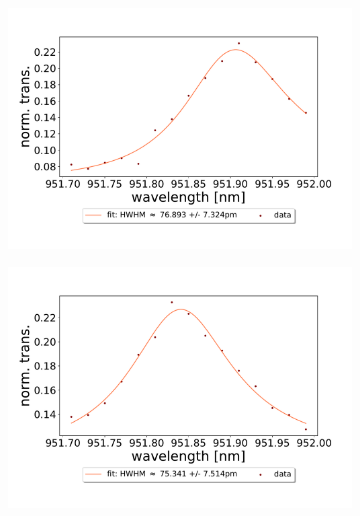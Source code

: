 \begin{figure}[h!]
    \centering
    \begin{subfigure}[b]{0.49\textwidth}
        \includegraphics[width=\textwidth]{figures/results/double fano fits/120um_M3:M5_fit_1.pdf}
        \caption{}
        \label{fig:120um_M3:M5_fit_1}
    \end{subfigure}
    \begin{subfigure}[b]{0.49\textwidth}
        \includegraphics[width=\textwidth]{figures/results/double fano fits/120um_M3:M5_fit_2.pdf}
        \caption{}
        \label{fig:120um_M3:M5_fit_2}
    \end{subfigure}
    \begin{subfigure}[b]{0.49\textwidth}

\end{subfigure}
\end{figure}
